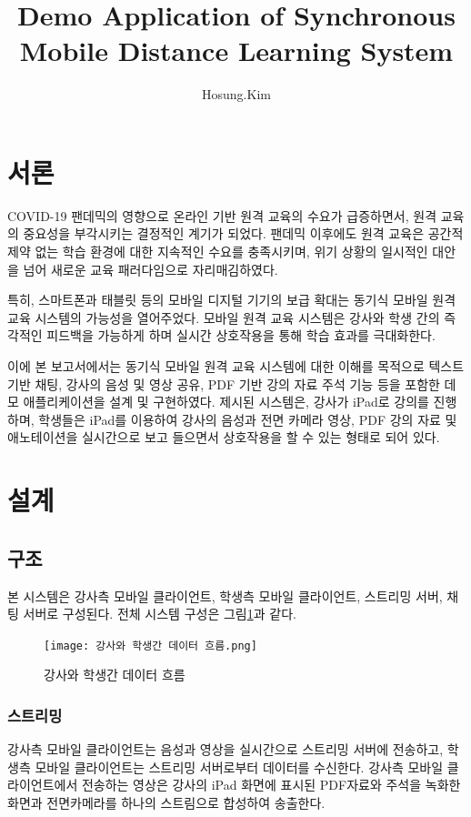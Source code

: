 \documentclass[a4paper]{article}
\title{Demo Application of Synchronous Mobile Distance Learning System}
\author{Hosung.Kim}
\begin{document}
\maketitle

\section{서론}
COVID-19 팬데믹의 영향으로 온라인 기반 원격 교육의 수요가 급증하면서, 원격 교육의 중요성을 부각시키는 결정적인 계기가 되었다. 팬데믹 이후에도 원격 교육은 공간적 제약 없는 학습 환경에 대한 지속적인 수요를 충족시키며, 위기 상황의 일시적인 대안을 넘어 새로운 교육 패러다임으로 자리매김하였다.

특히, 스마트폰과 태블릿 등의 모바일 디지털 기기의 보급 확대는 동기식 모바일 원격 교육 시스템의 가능성을 열어주었다. 모바일 원격 교육 시스템은 강사와 학생 간의 즉각적인 피드백을 가능하게 하며 실시간 상호작용을 통해 학습 효과를 극대화한다.

이에 본 보고서에서는 동기식 모바일 원격 교육 시스템에 대한 이해를 목적으로 텍스트 기반 채팅, 강사의 음성 및 영상 공유, PDF 기반 강의 자료 주석 기능 등을 포함한 데모 애플리케이션을 설계 및 구현하였다. 제시된 시스템은, 강사가 iPad로 강의를 진행하며, 학생들은 iPad를 이용하여 강사의 음성과 전면 카메라 영상, PDF 강의 자료 및 애노테이션을 실시간으로 보고 들으면서 상호작용을 할 수 있는 형태로 되어 있다.

\section{설계}
\subsection{구조}
본 시스템은 강사측 모바일 클라이언트, 학생측 모바일 클라이언트, 스트리밍 서버, 채팅 서버로 구성된다. 전체 시스템 구성은 그림\ref{fig:fig1}과 같다.
\begin{figure}[htbp]
    \begin{center}
    \texttt{[image: 강사와 학생간 데이터 흐름.png]}
    \caption{강사와 학생간 데이터 흐름}
    \label{fig:fig1}
    \end{center}
\end{figure}
\newpage
\subsubsection{스트리밍}
강사측 모바일 클라이언트는 음성과 영상을 실시간으로 스트리밍 서버에 전송하고, 학생측 모바일 클라이언트는 스트리밍 서버로부터 데이터를 수신한다. 강사측 모바일 클라이언트에서 전송하는 영상은 강사의 iPad 화면에 표시된 PDF자료와 주석을 녹화한 화면과 전면카메라를 하나의 스트림으로 합성하여 송출한다.
\end{document}
